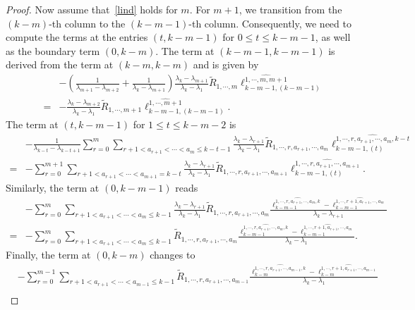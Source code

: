 \documentclass[10pt,a4paper]{amsart}
\newcommand{\nn}{\nonumber}
\begin{document}
\begin{proof}
	Now assume that~\eqref{lind} holds for $m$. For $m+1$, we transition from the $(k-m)$-th column to the $(k-m-1)$-th column. Consequently, we need to compute the terms at the entries $(t,k-m-1)$ for $0\le t\le k-m-1$, as well as the boundary term $(0,k-m)$. The term at $(k-m-1,k-m-1)$ is derived from the term at $(k-m,k-m)$ and is given by
	\begin{align}
		&-\left(\frac{1}{\lambda_{m+1}-\lambda_{m+2}}+\frac{1}{\lambda_k-\lambda_{m+1}}\right)\frac{\lambda_k-\lambda_{m+1}}{\lambda_k-\lambda_1}\widetilde R_{1,\cdots,m}\ell_{k-m-1,(k-m-1)}^{\widehat{1,\cdots,m,m+1}}\nn\\
		=&-\frac{\lambda_k-\lambda_{m+2}}{\lambda_k-\lambda_1}\widetilde R_{1,\cdots,m+1}\ell_{k-m-1,(k-m-1)}^{\widehat{1,\cdots,m+1}}. \label{part1}
	\end{align}
	The term at $(t,k-m-1)$ for $1\le t\le k-m-2$ is
	\begin{align}
		&-\frac{1}{\lambda_{k-t}-\lambda_{k-t+1}}\sum_{r=0}^{m}\sum_{r+1<a_{r+1}<\cdots<a_m\le k-t-1}\frac{\lambda_k-\lambda_{r+1}}{\lambda_k-\lambda_1}\widetilde R_{1,\cdots,r,a_{r+1},\cdots,a_m}\ell_{k-m-1,(t)}^{\widehat{1,\cdots,r,a_{r+1},\cdots,a_m,k-t}}\nn\\
		=&-\sum_{r=0}^{m+1}\sum_{r+1<a_{r+1}<\cdots<a_{m+1}=k-t}\frac{\lambda_k-\lambda_{r+1}}{\lambda_k-\lambda_1}\widetilde R_{1,\cdots,r,a_{r+1},\cdots,a_{m+1}}\ell_{k-m-1,(t)}^{\widehat{1,\cdots,r,a_{r+1},\cdots,a_{m+1}}}. \label{part2}
	\end{align}
	Similarly, the term at $(0,k-m-1)$ reads
	\begin{align}
		&-\sum_{r=0}^{m}\sum_{r+1<a_{r+1}<\cdots<a_m\le k-1}\frac{\lambda_k-\lambda_{r+1}}{\lambda_k-\lambda_1}\widetilde R_{1,\cdots,r,a_{r+1},\cdots,a_m}\frac{\ell_{k-m-1}^{\widehat{1,\cdots,r,a_{r+1},\cdots,a_m,k}}-\ell_{k-m-1}^{\widehat{1,\cdots,r+1,a_{r+1},\cdots,a_m}}}{\lambda_k-\lambda_{r+1}}\nn\\
		=&-\sum_{r=0}^{m}\sum_{r+1<a_{r+1}<\cdots<a_m\le k-1}\widetilde R_{1,\cdots,r,a_{r+1},\cdots,a_m}\frac{\ell_{k-m-1}^{\widehat{1,\cdots,r,a_{r+1},\cdots,a_m,k}}-\ell_{k-m-1}^{\widehat{1,\cdots,r+1,a_{r+1},\cdots,a_m}}}{\lambda_k-\lambda_1}. \label{part3}
	\end{align}
	Finally, the term at $(0,k-m)$ changes to
	\begin{align}
		& -\sum_{r=0}^{m-1}\sum_{r+1<a_{r+1}<\cdots<a_{m-1}\le k-1}\widetilde R_{1,\cdots,r,a_{r+1},\cdots,a_{m-1}}\frac{\ell_{k-m}^{\widehat{1,\cdots,r,a_{r+1},\cdots,a_{m-1},k}}-\ell_{k-m}^{\widehat{1,\cdots,r+1,a_{r+1},\cdots,a_{m-1}}}}{\lambda_k-\lambda_1} \nn\\

\end{align}
\end{proof}
\end{document}
